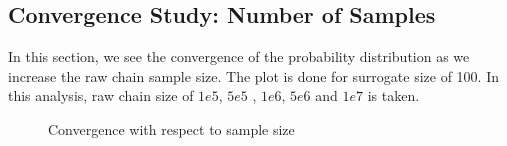 \subsection{Convergence Study: Number of Samples }

 In this section, we see the convergence of the probability distribution as we increase the raw chain sample size. The plot is done for surrogate size of 100. In this analysis, raw chain size of $1e5$, $5e5$ , $1e6$, $5e6$ and $1e7$ is taken.

\begin{figure}[H]
            \caption{Convergence with respect to sample size}
\end{figure}


